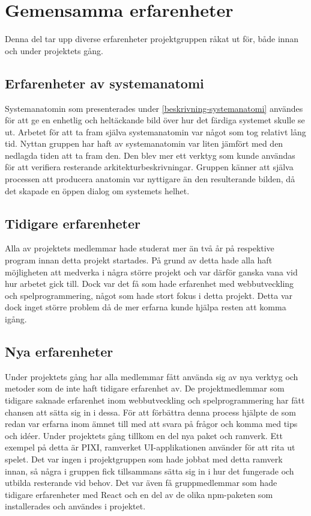 
\section{Gemensamma erfarenheter}
Denna del tar upp diverse erfarenheter projektgruppen råkat ut för, både innan och under projektets gång.

\subsection{Erfarenheter av systemanatomi}
Systemanatomin som presenterades under \ref{beskrivning-systemanatomi} användes för att ge en enhetlig och heltäckande bild över hur det färdiga systemet skulle se ut. Arbetet för att ta fram själva systemanatomin var något som tog relativt lång tid. Nyttan gruppen har haft av systemanatomin var liten jämfört med den nedlagda tiden att ta fram den. Den blev mer ett verktyg som kunde användas för att verifiera resterande arkitekturbeskrivningar. Gruppen känner att själva processen att producera anatomin var nyttigare än den resulterande bilden, då det skapade en öppen dialog om systemets helhet.

\subsection{Tidigare erfarenheter}
Alla av projektets medlemmar hade studerat mer än två år på respektive program innan detta projekt startades. På grund av detta hade alla haft möjligheten att medverka i några större projekt och var därför ganska vana vid hur arbetet gick till. Dock var det få som hade erfarenhet med webbutveckling och spelprogrammering, något som hade stort fokus i detta projekt. Detta var dock inget större problem då de mer erfarna kunde hjälpa resten att komma igång.

\subsection{Nya erfarenheter}
Under projektets gång har alla medlemmar fått använda sig av nya verktyg och metoder som de inte haft tidigare erfarenhet av. De projektmedlemmar som tidigare saknade erfarenhet inom webbutveckling och spelprogrammering har fått chansen att sätta sig in i dessa. För att förbättra denna process hjälpte de som redan var erfarna inom ämnet till med att svara på frågor och komma med tips och idéer. Under projektets gång tillkom en del nya paket och ramverk. Ett exempel på detta är PIXI, ramverket UI-applikationen använder för att rita ut spelet. Det var ingen i projektgruppen som hade jobbat med detta ramverk innan, så några i gruppen fick tillsammans sätta sig in i hur det fungerade och utbilda resterande vid behov. Det var även få gruppmedlemmar som hade tidigare erfarenheter med React och en del av de olika npm-paketen som installerades och användes i projektet.

